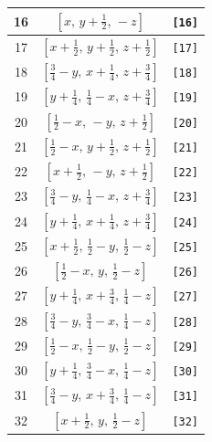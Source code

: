 \documentclass[fleqn,8pt]{jsarticle}
\begin{document}
\begin{longtable}{ccc}
16 & $\left[ x,\, y + \frac{1}{2},\, - z \right]$ & {\tt [16]} \\ \hline
17 & $\left[ x + \frac{1}{2},\, y + \frac{1}{2},\, z + \frac{1}{2} \right]$ & {\tt [17]} \\ \hline
18 & $\left[ \frac{3}{4} - y,\, x + \frac{1}{4},\, z + \frac{3}{4} \right]$ & {\tt [18]} \\ \hline
19 & $\left[ y + \frac{1}{4},\, \frac{1}{4} - x,\, z + \frac{3}{4} \right]$ & {\tt [19]} \\ \hline
20 & $\left[ \frac{1}{2} - x,\, - y,\, z + \frac{1}{2} \right]$ & {\tt [20]} \\ \hline
21 & $\left[ \frac{1}{2} - x,\, y + \frac{1}{2},\, z + \frac{1}{2} \right]$ & {\tt [21]} \\ \hline
22 & $\left[ x + \frac{1}{2},\, - y,\, z + \frac{1}{2} \right]$ & {\tt [22]} \\ \hline
23 & $\left[ \frac{3}{4} - y,\, \frac{1}{4} - x,\, z + \frac{3}{4} \right]$ & {\tt [23]} \\ \hline
24 & $\left[ y + \frac{1}{4},\, x + \frac{1}{4},\, z + \frac{3}{4} \right]$ & {\tt [24]} \\ \hline
25 & $\left[ x + \frac{1}{2},\, \frac{1}{2} - y,\, \frac{1}{2} - z \right]$ & {\tt [25]} \\ \hline
26 & $\left[ \frac{1}{2} - x,\, y,\, \frac{1}{2} - z \right]$ & {\tt [26]} \\ \hline
27 & $\left[ y + \frac{1}{4},\, x + \frac{3}{4},\, \frac{1}{4} - z \right]$ & {\tt [27]} \\ \hline
28 & $\left[ \frac{3}{4} - y,\, \frac{3}{4} - x,\, \frac{1}{4} - z \right]$ & {\tt [28]} \\ \hline
29 & $\left[ \frac{1}{2} - x,\, \frac{1}{2} - y,\, \frac{1}{2} - z \right]$ & {\tt [29]} \\ \hline
30 & $\left[ y + \frac{1}{4},\, \frac{3}{4} - x,\, \frac{1}{4} - z \right]$ & {\tt [30]} \\ \hline
31 & $\left[ \frac{3}{4} - y,\, x + \frac{3}{4},\, \frac{1}{4} - z \right]$ & {\tt [31]} \\ \hline
32 & $\left[ x + \frac{1}{2},\, y,\, \frac{1}{2} - z \right]$ & {\tt [32]} \\
\end{longtable}
\end{document}
